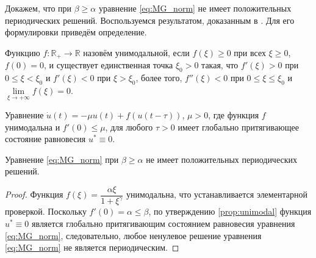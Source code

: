 Докажем, что при $\beta \geq \alpha$ уравнение \eqref{eq:MG_norm} не имеет положительных периодических решений. Воспользуемся результатом, доказанным в \cite[Proposition 3.1]{Roest2007}. Для его формулировки приведём определение.

\begin{definition}
	Функцию $f: \mathbb{R}_{+} \to \mathbb{R}$ назовём унимодальной, если $f(\xi) \geq 0$ при всех $\xi \geq 0$, $f(0) = 0$, и существует единственная точка $\xi_0 > 0$ такая, что $f'(\xi) > 0$ при $0 \leq \xi < \xi_0$ и $f'(\xi) < 0$ при $\xi > \xi_0$, более того, $f''(\xi) < 0$ при $0 \leq \xi \leq \xi_0$ и $\lim\limits_{\xi \to +\infty} f(\xi) = 0$.
\end{definition}

\begin{proposition}
	\label{prop:unimodal}
	\cite{Roest2007} Уравнение $\dot{u}(t) = -\mu u(t) + f(u(t - \tau))$, $\mu > 0$, где функция $f$ унимодальна и $f'(0) \leq \mu$, для любого $\tau > 0$ имеет глобально притягивающее состояние равновесия $u^* \equiv 0$.
\end{proposition}
	
\begin{proposition}
	Уравнение \eqref{eq:MG_norm} при $\beta \geq \alpha$ не имеет положительных периодических решений.
\end{proposition}
\begin{proof}
	Функция $f(\xi) = \dfrac{\alpha \xi}{1 + \xi^{\gamma}}$ унимодальна, что устанавливается элементарной проверкой. Поскольку $f'(0) = \alpha \leq \beta$, по утверждению \ref{prop:unimodal} функция $u^* \equiv 0$ является глобально притягивающим состоянием равновесия уравнения \eqref{eq:MG_norm}, следовательно, любое ненулевое решение уравнения \eqref{eq:MG_norm} не является периодическим. %
\end{proof}

